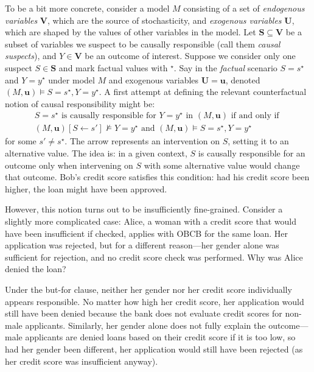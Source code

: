 \documentclass[twoside,11pt]{article}
\begin{document}
To be a bit more concrete, consider a model $M$ consisting of a set of \emph{endogenous variables} $\mathbf{V}$, which are the source of stochasticity,  and \emph{exogenous variables} $\mathbf{U}$, which are shaped by the values of other variables in the model. Let $\mathbf{S} \subseteq \mathbf{V}$ be a subset of variables we suspect to be causally responsible (call them \emph{causal suspects}), and $Y \in  \mathbf{V}$ be an outcome of interest. Suppose we  consider only one suspect $S \in \mathbf{S}$ and mark factual values with $^\star$. Say in the \emph{factual} scenario  $S = s^\star$ and $Y = y^\star$ under model $M$ and exogenous variables $\mathbf{U} = \mathbf{u}$, denoted $(M, \mathbf{u}) \models S=s^\star, Y=y^\star$. A first attempt at defining the relevant counterfactual notion of causal responsibility might be:
\begin{align*}
S=s^\star \text{ is causally responsible for } Y=y^\star \text{ in } (M, \mathbf{u}) \text{ if and only if } \\   (M, \mathbf{u})[S \leftarrow s'] \not \models Y=y^\star \text{ and } (M, \mathbf{u}) \models S=s^\star, Y=y^\star
\end{align*}
for some $s' \neq s^\star$.
The arrow represents an intervention on $S$, setting it to an alternative value. The idea is: in a given context, $S$ is causally responsible for an outcome only when intervening on $S$ with some alternative value would change that outcome. Bob’s credit score satisfies this condition: had his credit score been higher, the loan might have been approved.  

However, this notion turns out to be insufficiently fine-grained. Consider a slightly more complicated case: Alice, a woman with a credit score that would have been insufficient if checked, applies with OBCB for the same loan. Her application was rejected, but for a different reason---her gender alone was sufficient for rejection, and no credit score check was performed. Why was Alice denied the loan?  

Under the but-for clause, neither her gender nor her credit score individually appears responsible. No matter how high her credit score, her application would still have been denied because the bank does not evaluate credit scores for non-male applicants. Similarly, her gender alone does not fully explain the outcome—male applicants are denied loans based on their credit score if it is too low, so had her gender been different, her application would still have been rejected (as her credit score was insufficient anyway).
\end{document}
